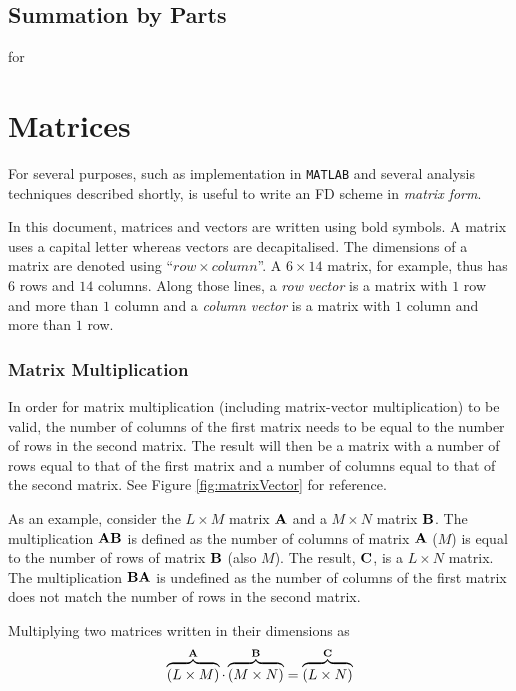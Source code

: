 \subsection{Summation by Parts}
for 

\section{Matrices}
For several purposes, such as implementation in \texttt{MATLAB} and several analysis techniques described shortly, is useful to write an FD scheme in \textit{matrix form}. 

In this document, matrices and vectors are written using bold symbols.  A matrix uses a capital letter whereas vectors are decapitalised. The dimensions of a matrix are denoted using ``$row \times column$''. A $6\times 14$ matrix, for example, thus has $6$ rows and $14$ columns. Along those lines, a \textit{row vector} is a matrix with $1$ row and more than $1$ column and a \textit{column vector} is a matrix with $1$ column and more than $1$ row. 

\subsubsection{Matrix Multiplication}
In order for matrix multiplication (including matrix-vector multiplication) to be valid, the number of columns of the first matrix needs to be equal to the number of rows in the second matrix. The result will then be a matrix with a number of rows equal to that of the first matrix and a number of columns equal to that of the second matrix. See Figure \ref{fig:matrixVector} for reference.

As an example, consider the $L
\times M$ matrix $
\mathbf{A}$ and a $M\times N$ matrix $
\mathbf{B}$. The multiplication $\mathbf{A}\mathbf{B}$ is defined as the number of columns of matrix $
\mathbf{A}$ ($M$) is equal to the number of rows of matrix $\mathbf{B}$ (also $M$). The result, $\mathbf{C}$, is a $L \times N$ matrix. The multiplication $\mathbf{B}\mathbf{A}$ is undefined as the number of columns of the first matrix does not match the number of rows in the second matrix. 

Multiplying two matrices written in their dimensions as 
\begin{equation}
    \overbrace{(L\times M)}^{\mathbf{A}}\cdot \overbrace{(M\times N)}^{\mathbf{B}} = \overbrace{(L
    \times N)}^{\mathbf{C}}
\end{equation}
 
